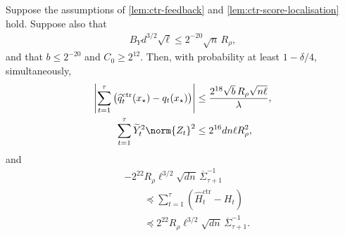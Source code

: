 \begin{proposition}
    \label{prop:ctr-concentration}
    Suppose the assumptions of \cref{lem:ctr-feedback} and
    \cref{lem:ctr-score-localisation} hold.  Suppose also that
    \begin{align}
        B_Yd^{3/2}\sqrt\ell
        \leq2^{-20}\sqrt n\,R_\rho,
        \label{eq:ctr-H-Freedman-scale}
    \end{align}
    and that $b\leq2^{-20}$ and $C_0\geq2^{12}$.  Then, with probability
    at least $1-\delta/4$,
    simultaneously,
    \begin{align}
        \left|
        \sum_{t=1}^{\tau}
        \left(
        \widehat q_t^{\mathrm{ctr}}(x_\star)-q_t(x_\star)
        \right)
        \right|
         & \leq
        \frac{2^{18}\sqrt b\,R_\rho\sqrt{n\ell}}\lambda,
        \label{eq:ctr-q-concentration}
        \\
        \sum_{t=1}^{\tau}
        \widetilde Y_t^2\norm{Z_t}^2
         & \leq2^{16}dn\ell R_\rho^2,
        \label{eq:ctr-random-gradient-energy}
    \end{align}
    and
    \begin{align}
         & -2^{22}R_\rho\ell^{3/2}\sqrt{dn}\,
        \overline\Sigma_{\tau+1}^{-1}
        \nonumber                             \\
         & \qquad\preceq
        \sum_{t=1}^{\tau}
        \left(\widehat H_t^{\mathrm{ctr}}-H_t\right)
        \nonumber                             \\
         & \qquad\preceq
        2^{22}R_\rho\ell^{3/2}\sqrt{dn}\,
        \overline\Sigma_{\tau+1}^{-1}.
        \label{eq:ctr-H-concentration}
    \end{align}
\end{proposition}

